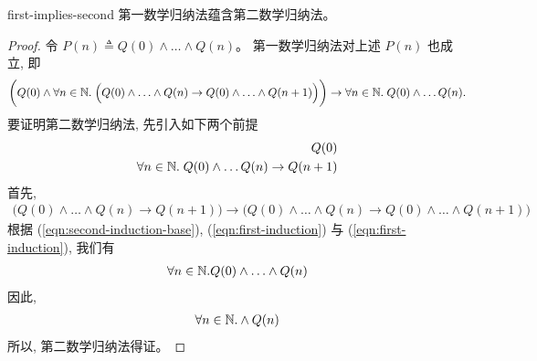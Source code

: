 \begin{theorem}{}{first-implies-second}
  第一数学归纳法蕴含第二数学归纳法。
\end{theorem}

\begin{proof}
  令 $P(n) \triangleq Q(0) \land \ldots \land Q(n)$。
  第一数学归纳法对上述 $P(n)$ 也成立, 即
  \begin{align}
    \biggl(Q(0) \land \forall n \in \mathbb{N}.\;
    \Big(Q(0) \land \ldots \land Q(n) \to
      Q(0) \land \ldots \land Q(n+1) \Big) \biggr)
    \to \forall n \in \mathbb{N}.\; Q(0) \land \ldots Q(n).
    \label{eqn:first-induction}
  \end{align}
  要证明第二数学归纳法, 先引入如下两个前提
  \begin{align}
    Q(0) \label{eqn:second-induction-base} \\
    \forall n \in \mathbb{N}.\; Q(0) \land \ldots Q(n) \to Q(n+1)
  \end{align} \label{eqn:second-induction}
  首先, 
  \begin{align}
    \Big(Q(0) \land \ldots \land Q(n) \to Q(n+1)\Big) \to
    \Big(Q(0) \land \ldots \land Q(n) \to Q(0) \land \ldots \land Q(n+1)\Big)
    \label{eqn:first-second}
  \end{align}
  根据 (\ref{eqn:second-induction-base}), (\ref{eqn:first-induction}) 与 (\ref{eqn:first-induction}),
  我们有
  \begin{align}
    \forall n \in \mathbb{N}. Q(0) \land \ldots \land Q(n) 
  \end{align}
  因此,
  \begin{align}
    \forall n \in \mathbb{N}. \land Q(n)
  \end{align}
  所以, 第二数学归纳法得证。
\end{proof}
